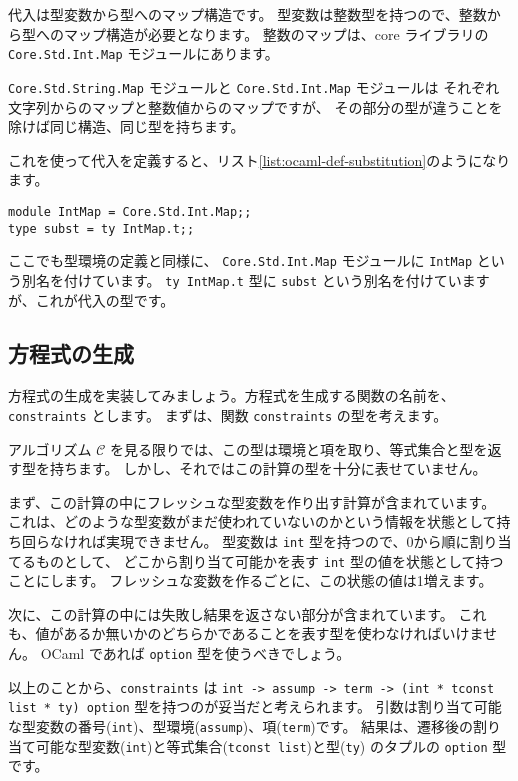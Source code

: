 代入は型変数から型へのマップ構造です。
型変数は整数型を持つので、整数から型へのマップ構造が必要となります。
整数のマップは、core ライブラリの \texttt{Core.Std.Int.Map} モジュールにあります。

\texttt{Core.Std.String.Map} モジュールと \texttt{Core.Std.Int.Map} モジュールは
それぞれ文字列からのマップと整数値からのマップですが、
その部分の型が違うことを除けば同じ構造、同じ型を持ちます。

これを使って代入を定義すると、リスト\ref{list:ocaml-def-substitution}のようになります。

\begin{lstlisting}[caption=代入の定義, label=list:ocaml-def-substitution]
module IntMap = Core.Std.Int.Map;;
type subst = ty IntMap.t;;
\end{lstlisting}

ここでも型環境の定義と同様に、
\texttt{Core.Std.Int.Map} モジュールに \texttt{IntMap} という別名を付けています。
\texttt{ty IntMap.t} 型に \texttt{subst} という別名を付けていますが、これが代入の型です。

\subsection{方程式の生成}

方程式の生成を実装してみましょう。方程式を生成する関数の名前を、\texttt{constraints} とします。
まずは、関数 \texttt{constraints} の型を考えます。

アルゴリズム $\mathcal C$ を見る限りでは、この型は環境と項を取り、等式集合と型を返す型を持ちます。
しかし、それではこの計算の型を十分に表せていません。

まず、この計算の中にフレッシュな型変数を作り出す計算が含まれています。
これは、どのような型変数がまだ使われていないのかという情報を状態として持ち回らなければ実現できません。
型変数は \texttt{int} 型を持つので、0から順に割り当てるものとして、
どこから割り当て可能かを表す \texttt{int} 型の値を状態として持つことにします。
フレッシュな変数を作るごとに、この状態の値は1増えます。

次に、この計算の中には失敗し結果を返さない部分が含まれています。
これも、値があるか無いかのどちらかであることを表す型を使わなければいけません。
OCaml であれば \texttt{option} 型を使うべきでしょう。

以上のことから、\texttt{constraints} は
\texttt{int -> assump -> term -> (int * tconst list * ty) option} 型を持つのが妥当だと考えられます。
引数は割り当て可能な型変数の番号(\texttt{int})、型環境(\texttt{assump})、項(\texttt{term})です。
結果は、遷移後の割り当て可能な型変数(\texttt{int})と等式集合(\texttt{tconst list})と型(\texttt{ty})
のタプルの \texttt{option} 型です。

